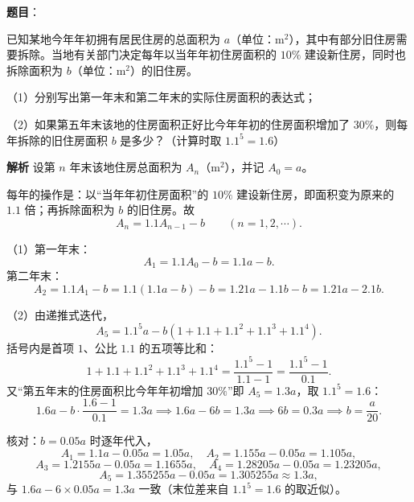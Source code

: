 \begin{answer}

\textbf{题目}：

已知某地今年年初拥有居民住房的总面积为 $a$（单位：$\mathrm{m}^2$），其中有部分旧住房需要拆除。当地有关部门决定每年以当年年初住房面积的 $10\%$ 建设新住房，同时也拆除面积为 $b$（单位：$\mathrm{m}^2$）的旧住房。

（1）分别写出第一年末和第二年末的实际住房面积的表达式；

（2）如果第五年末该地的住房面积正好比今年年初的住房面积增加了 $30\%$，则每年拆除的旧住房面积 $b$ 是多少？（计算时取 $1.1^5=1.6$）

\textbf{解析}
设第 $n$ 年末该地住房总面积为 $A_n$（$\mathrm{m}^2$），并记 $A_0=a$。

每年的操作是：以“当年年初住房面积”的 $10\%$ 建设新住房，即面积变为原来的 $1.1$ 倍；再拆除面积为 $b$ 的旧住房。故
\nopagebreak[4]
\[A_n=1.1A_{n-1}-b\qquad(n=1,2,\cdots).\]

（1）第一年末：
\nopagebreak[4]
\[A_1=1.1A_0-b=1.1a-b.\]
第二年末：
\nopagebreak[4]
\[A_2=1.1A_1-b=1.1(1.1a-b)-b=1.21a-1.1b-b=1.21a-2.1b.\]

（2）由递推式迭代，
\nopagebreak[4]
\[A_5=1.1^5a-b\left(1+1.1+1.1^2+1.1^3+1.1^4\right).\]
括号内是首项 $1$、公比 $1.1$ 的五项等比和：
\nopagebreak[4]
\[1+1.1+1.1^2+1.1^3+1.1^4=\frac{1.1^5-1}{1.1-1}=\frac{1.1^5-1}{0.1}.\]
又“第五年末的住房面积比今年年初增加 $30\%$”即 $A_5=1.3a$，取 $1.1^5=1.6$：
\nopagebreak[4]
\[1.6a-b\cdot\frac{1.6-1}{0.1}=1.3a\implies 1.6a-6b=1.3a\implies 6b=0.3a\implies b=\frac{a}{20}.\]

核对：$b=0.05a$ 时逐年代入，
\nopagebreak[4]
\[A_1=1.1a-0.05a=1.05a,\quad A_2=1.155a-0.05a=1.105a,\]
\nopagebreak[4]
\[A_3=1.2155a-0.05a=1.1655a,\quad A_4=1.28205a-0.05a=1.23205a,\]
\nopagebreak[4]
\[A_5=1.355255a-0.05a=1.305255a\approx1.3a,\]
与 $1.6a-6\times0.05a=1.3a$ 一致（末位差来自 $1.1^5=1.6$ 的取近似）。


\end{answer}
